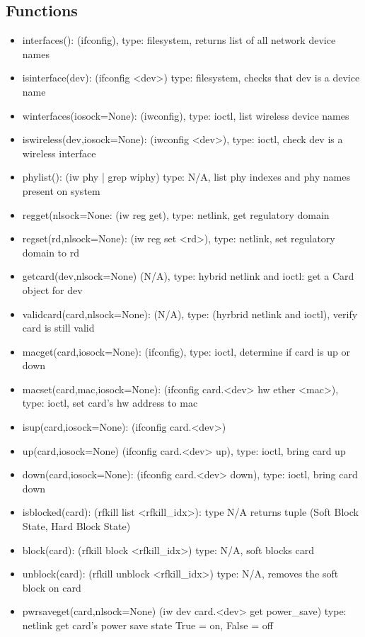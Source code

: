 \documentclass[11pt]{article}
\begin{document}
\begin{appendices}
\subsection{Functions}
\begin{itemize}
\item interfaces(): (ifconfig), type: filesystem, returns list of all network 
device names
\item isinterface(dev): (ifconfig <dev>) type: filesystem, checks that dev is a
device name
\item winterfaces(iosock=None): (iwconfig), type: ioctl, list wireless device 
names
\item iswireless(dev,iosock=None): (iwconfig <dev>), type: ioctl, check dev is a 
wireless interface
\item phylist(): (iw phy | grep wiphy) type: N/A, list phy indexes and phy names 
present on system
\item regget(nlsock=None: (iw reg get), type: netlink, get regulatory domain
\item regset(rd,nlsock=None): (iw reg set <rd>), type: netlink, set regulatory domain 
to rd
\item getcard(dev,nlsock=None) (N/A), type: hybrid netlink and ioctl: get a Card 
object for dev
\item validcard(card,nlsock=None): (N/A), type: (hyrbrid netlink and ioctl), verify
card is still valid
\item macget(card,iosock=None): (ifconfig), type: ioctl, determine if card is up
or down
\item macset(card,mac,iosock=None): (ifconfig card.<dev> hw ether <mac>), type: 
ioctl, set card's hw address to mac
\item isup(card,iosock=None): (ifconfig card.<dev>) 
\item up(card,iosock=None) (ifconfig card.<dev> up), type: ioctl, bring card up
\item down(card,iosock=None): (ifconfig card.<dev> down), type: ioctl, bring card 
down
\item isblocked(card): (rfkill list <rfkill\_idx>): type N/A returns tuple 
(Soft Block State, Hard Block State) 
\item block(card): (rfkill block <rfkill\_idx>) type: N/A, soft blocks card
\item unblock(card): (rfkill unblock <rfkill\_idx>) type: N/A, removes the soft 
block on card
\item pwrsaveget(card,nlsock=None) (iw dev card.<dev> get power\_save) type: netlink
get card's power save state True = on, False = off

\end{itemize}
\end{appendices}
\end{document}
